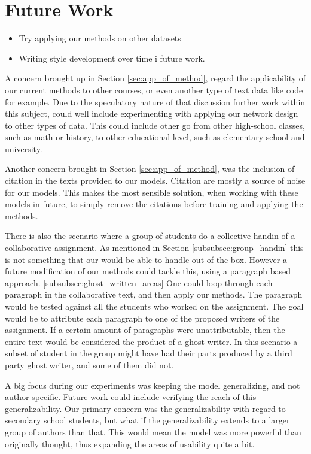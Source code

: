 \section{Future Work} \label{sec:future_work}


\begin{itemize}

    \item Try applying our methods on other datasets
    \item Writing style development over time i future work.

\end{itemize}

A concern brought up in Section \ref{sec:app_of_method}, regard the
applicability of our current methods to other courses, or even another type
of text data like code for example. Due to the speculatory nature of that
discussion further work within this subject, could well include experimenting
with applying our network design to other types of data. This could include
other go from other high-school classes, such as math or history, to other
educational level, such as elementary school and university.

Another concern brought in Section \ref{sec:app_of_method}, was the inclusion
of citation in the texts provided to our models. Citation are mostly a source
of noise for our models. This makes the most sensible solution, when working
with these models in future, to simply remove the citations before training and
applying the methods.

There is also the scenario where a group of students do a collective handin of a
collaborative assignment. As mentioned in Section \ref{subsubsec:group_handin}
this is not something that our would be able to handle out of the box. However
a future modification of our methods could tackle this, using a paragraph based
approach. \ref{subsubsec:ghost_written_areas} One could loop through each
paragraph in the collaborative text, and then apply our methods. The paragraph
would be tested against all the students who worked on the assignment. The goal
would be to attribute each paragraph to one of the proposed writers of the
assignment. If a certain amount of paragraphs were unattributable, then the
entire text would be considered the product of a ghost writer. In this scenario
a subset of student in the group might have had their parts produced by a third
party ghost writer, and some of them did not.

A big focus during our experiments was keeping the model generalizing, and
not author specific. Future work could include verifying the reach of this
generalizability. Our primary concern was the generalizability with regard to
secondary school students, but what if the generalizability extends to a larger
group of authors than that. This would mean the model was more powerful than
originally thought, thus expanding the areas of usability quite a bit.




